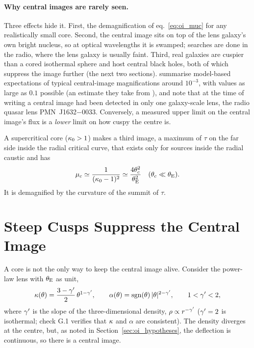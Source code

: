 \paragraph{Why central images are rarely seen.}
Three effects hide it.  First, the demagnification of
eq.~\eqref{eq:oi_muc} for any realistically small core.  Second, the
central image sits on top of the lens galaxy's own bright nucleus, so
at optical wavelengths it is swamped; searches are done in the radio,
where the lens galaxy is usually faint.  Third, real galaxies are
cuspier than a cored isothermal sphere and host central black holes,
both of which suppress the image further (the next two sections).
\citet[][Sect.~6.2.2]{congdon_principles_2018} summarise model-based
expectations of typical central-image magnifications around $10^{-3}$,
with values as large as $0.1$ possible (an estimate they take from
\citealt{keeton_2003}), and note that at the time of
writing a central image had been detected in only one galaxy-scale lens,
the radio quasar lens PMN~J1632$-$0033.  Conversely, a measured upper
limit on the central image's flux is a \emph{lower} limit on how cuspy
the centre is.

\begin{keybox}
A supercritical core ($\kappa_0>1$) makes a third image, a maximum of
$\tau$ on the far side inside the radial critical curve, that
exists only for sources inside the radial caustic and has
\[
  \mu_c\simeq\frac{1}{(\kappa_0-1)^2}\simeq\frac{4\theta_c^2}{\theta_{\mathrm{E}}^2}
  \quad(\theta_c\ll\theta_{\mathrm{E}}).
\]
It is demagnified by the curvature of the summit of $\tau$.
\end{keybox}


\section{Steep Cusps Suppress the Central Image}
\label{sec:oi_steep}

A core is not the only way to keep the central image alive.  Consider
the power-law lens with $\theta_{\mathrm{E}}$ as unit,
\begin{equation}
    \kappa(\theta) = \frac{3-\gamma'}{2}\,\theta^{1-\gamma'}, \qquad
    \alpha(\theta) = \operatorname{sgn}(\theta)\,|\theta|^{2-\gamma'},
    \qquad 1<\gamma'<2,
    \label{eq:oi_powerlaw}
\end{equation}
where $\gamma'$ is the slope of the three-dimensional density,
$\rho\propto r^{-\gamma'}$ ($\gamma'=2$ is isothermal; check G.1 verifies that
$\kappa$ and $\alpha$ are consistent).  The density diverges at the
centre, but, as noted in Section~\ref{sec:oi_hypotheses}, the
deflection is continuous, so there is a central image.

